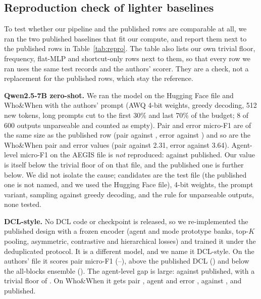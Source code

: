 \documentclass[conference]{IEEEtran}
\begin{document}




\subsection{Reproduction check of lighter baselines}\label{sec:repro}
To test whether our pipeline and the published rows are comparable at all, we ran the two published baselines that fit our compute, and report them next to the published rows in Table~\ref{tab:repro}. The table also lists our own trivial floor, frequency, flat-MLP and shortcut-only rows next to them, so that every row we ran uses the same test records and the authors' scorer. They are a check, not a replacement for the published rows, which stay the reference.

\textbf{Qwen2.5-7B zero-shot.} We ran the model on the Hugging Face file and Who\&When with the authors' prompt (AWQ 4-bit weights, greedy decoding, 512 new tokens, long prompts cut to the first 30\% and last 70\% of the budget; 8 of 600 outputs unparseable and counted as empty). Pair and error micro-F1 are of the same size as the published row (pair \rpQwPair{} against \pubQwPair, error \rpQwError{} against \pubQwError{}) and so are the Who\&When pair and error values (pair \rpQwWWpair{} against 2.31, error \rpQwWWerror{} against 3.64). Agent-level micro-F1 on the AEGIS file is \emph{not} reproduced: \rpQwAgent{} against \pubQwAgent{} published. Our value is itself below the trivial floor of \floorHFagent{} on that file, and the published one is further below. We did not isolate the cause; candidates are the test file (the published one is not named, and we used the Hugging Face file), 4-bit weights, the prompt variant, sampling against greedy decoding, and the rule for unparseable outputs, none tested.

\textbf{DCL-style.} No DCL code or checkpoint is released, so we re-implemented the published design with a frozen encoder (agent and mode prototype banks, top-$K$ pooling, asymmetric, contrastive and hierarchical losses) and trained it under the deduplicated protocol. It is a different model, and we name it DCL-style. On the authors' file it scores \rpDclPair{} pair micro-F1 (\rpDclPairLo--\rpDclPairHi), above the published DCL (\pubDCL) and below the all-blocks ensemble (\ensAEpair). The agent-level gap is large: \rpDclAgent{} against \pubDCLagent{} published, with a trivial floor of \floorAEagent{}. On Who\&When it gets pair \rpDclWWpair{}, agent \rpDclWWagent{} and error \rpDclWWerror{}, against \pubDCLwwPair{}, \pubDCLwwAgent{} and \pubDCLwwError{} published.
\end{document}
